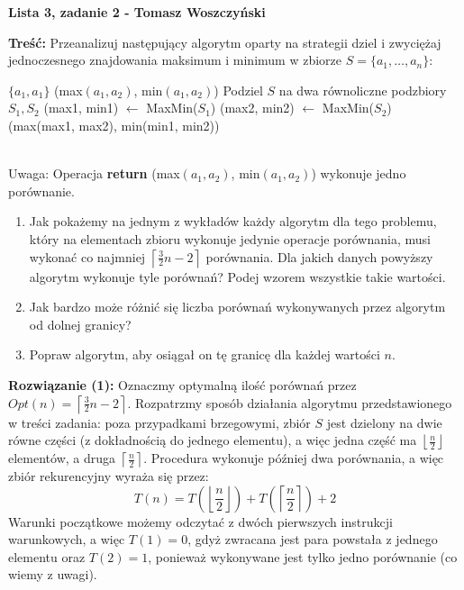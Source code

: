 \documentclass[a4paper,12pt]{article}
\newcommand{\floor}[1]{\left\lfloor #1 \right\rfloor}
\newcommand{\ceil}[1]{\left\lceil #1 \right\rceil}
\begin{document}
\noindent \textbf{Lista 3, zadanie 2 - Tomasz Woszczyński}\newline

\noindent \newline \textbf{Treść:} Przeanalizuj następujący algorytm oparty na strategii dziel i zwyciężaj jednoczesnego znajdowania maksimum i minimum w zbiorze $S = \{ a_1, \dots, a_n\}$: \newline
\begin{algorithmic}
	\State \Return $\{ a_1, a_1 \}$ 
	\State \Return (max$(a_1, a_2)$, min$(a_1, a_2)$)
\Else 
	\State Podziel $S$ na dwa równoliczne podzbiory $S_1, S_2$
	\State (max1, min1) $\gets$ MaxMin($S_1$)
	\State (max2, min2) $\gets$ MaxMin($S_2$)
	\State \Return (max(max1, max2), min(min1, min2))
\EndIf
\EndFunction
\end{algorithmic} 

~\\ \noindent Uwaga: Operacja \textbf{return}  (max$(a_1, a_2)$, min$(a_1, a_2)$) wykonuje jedno porównanie.
\begin{enumerate}
\item Jak pokażemy na jednym z wykładów każdy algorytm dla tego problemu, który na elementach zbioru wykonuje jedynie operacje porównania, musi wykonać co najmniej $\ceil{\frac{3}{2}n-2}$ porównania. Dla jakich danych powyższy algorytm wykonuje tyle porównań? Podej wzorem wszystkie takie wartości.
\item Jak bardzo może różnić się liczba porównań wykonywanych przez algorytm od dolnej granicy?
\item Popraw algorytm, aby osiągał on tę granicę dla każdej wartości $n$.
\end{enumerate} 

\noindent \textbf{Rozwiązanie (1):} Oznaczmy optymalną ilość porównań przez $Opt(n) = \ceil{\frac{3}{2}n-2}$. Rozpatrzmy sposób działania algorytmu przedstawionego w treści zadania: poza przypadkami brzegowymi, zbiór $S$ jest dzielony na dwie równe części (z dokładnością do jednego elementu), a więc jedna część ma $\floor{\frac{n}{2}}$ elementów, a druga $\ceil{\frac{n}{2}}$. Procedura wykonuje później dwa porównania, a więc zbiór rekurencyjny wyraża się przez:
$$ T(n) = T\left( \floor{\frac{n}{2}} \right) + T\left( \ceil{\frac{n}{2}} \right) + 2$$
\noindent Warunki początkowe możemy odczytać z dwóch pierwszych instrukcji warunkowych, a więc $T(1) = 0$, gdyż zwracana jest para powstała z jednego elementu oraz $T(2) = 1$, ponieważ wykonywane jest tylko jedno porównanie (co wiemy z uwagi). \newline
\end{document}

